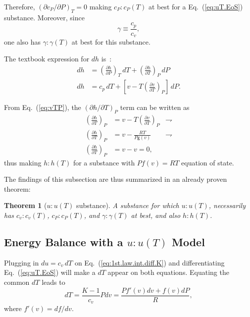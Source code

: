 \documentclass[fleqn,11pt]{SelfArx}
\newcommand{\parxyz}[3]{\left(\frac{\partial {{#1}}}{\partial {{#2}}}\right)_{\!\!\!{#3}}}
\newcommand{\inlxyz}[3]{({\partial {{#1}}}/{\partial {{#2}}})_{{#3}}}
\newtheorem{theorem}{Theorem}
\begin{document}
    Therefore, $\inlxyz{c_P}PT = 0$ making $c_P\!:\!c_P(T)$ at best for a  Eq.~(\ref{eq:uT.EoS})
    substance. Moreover, since
    \begin{equation}
        \gamma \equiv \frac{c_p}{c_v},
        \label{eq:def.gamma}
    \end{equation}
    \noindent one also has $\gamma\!:\!\gamma(T)$ at best for this substance.

    The textbook expression for $dh$ is~\cite{2013-CengelYA+BolesMA-AMGH}:
    \begin{align}
        dh & = \parxyz hPT \,dT + \parxyz hTP \,dP \\
        dh & = c_p\,dT + \left[v - T\parxyz vTP \right]\,dP.
        \label{eq:dh}
    \end{align}

    From Eq.~(\ref{eq:vTP}), the $\inlxyz hTP$ term can be written as
    \begin{align}
        \parxyz hTP & = v - T\parxyz vTP & \rightharpoondown \\
        \parxyz hTP & = v - \frac{RT}{P\mathsf{g}(v)} & \rightharpoondown \\
        \parxyz hTP & = v - v = 0,
        \label{eq:hTP}
    \end{align}
    \noindent thus making $h\!:\!h(T)$ for a substance with $Pf(v) = RT$ equation of state.

    The findings of this subsection are thus summarized in an already proven theorem:

    \begin{theorem}[$u\!:\!u(T)$ substance]\label{theo:uT.subst}
        A substance for which $u\!:\!u(T)$, necessarily has $c_v\!:\!c_v(T)$, $c_P\!:\!c_P(T)$,
        and $\gamma\!:\!\gamma(T)$ at best, and also $h\!:\!h(T)$.
    \end{theorem}

    \subsection{Energy Balance with a $u\!:\!u(T)$ Model}

    Plugging  in  $du  =  c_v\,dT$  on  Eq.~(\ref{eq:1st.law.int.diff.K})  and   differentiating
    Eq.~(\ref{eq:uT.EoS}) will make a $dT$ appear on both equations. Equating  the  common  $dT$
    leads to
    \begin{equation}
        dT = \frac{K-1}{c_v}Pdv = \frac{Pf'(v)dv + f(v)dP}{R},
        \label{eq:dT.1st.law.EoS}
    \end{equation}
    \noindent where $f'(v) = df/dv$.
\end{document}

